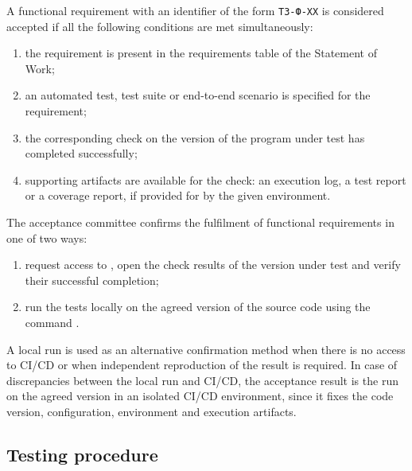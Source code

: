 \documentclass[12pt,a4paper]{extarticle}
\begin{document}
\begin{hseExample}
A functional requirement with an identifier of the form \texttt{ТЗ-Ф-XX} is considered accepted if all the following conditions are met simultaneously:

\begin{enumerate}[label=\arabic*), leftmargin=1.25cm]
    \item the requirement is present in the requirements table of the Statement of Work;
    \item an automated test, test suite or end-to-end scenario is specified for the requirement;
    \item the corresponding check on the version of the program under test has completed successfully;
    \item supporting artifacts are available for the check: an execution log, a test report or a coverage report, if provided for by the given environment.
\end{enumerate}

The acceptance committee confirms the fulfilment of functional requirements in one of two ways:

\begin{enumerate}[label=\arabic*), leftmargin=1.25cm]
    \item request access to , open the check results of the version under test and verify their successful completion;
    \item run the tests locally on the agreed version of the source code using the command .
\end{enumerate}

A local run is used as an alternative confirmation method when there is no access to CI/CD or when independent reproduction of the result is required. In case of discrepancies between the local run and CI/CD, the acceptance result is the run on the agreed version in an isolated CI/CD environment, since it fixes the code version, configuration, environment and execution artifacts.
\end{hseExample}

\subsection{Testing procedure}
\end{document}
